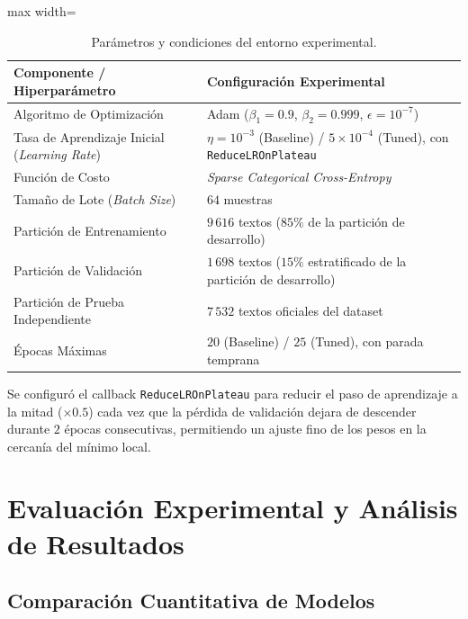 \documentclass[12pt, a4paper]{article}
\begin{document}
\begin{table}[H]
    \centering
    \caption{Parámetros y condiciones del entorno experimental.}
    \label{tab:training_conditions}
    \begin{adjustbox}{max width=\textwidth}
    \begin{tabular}{@{}ll@{}}
        \toprule
        \textbf{Componente / Hiperparámetro} & \textbf{Configuración Experimental} \\
        \midrule
        Algoritmo de Optimización            & Adam ($\beta_1 = 0.9$, $\beta_2 = 0.999$, $\epsilon = 10^{-7}$) \\
        Tasa de Aprendizaje Inicial (\textit{Learning Rate}) & $\eta = 10^{-3}$ (Baseline) / $5 \times 10^{-4}$ (Tuned), con \texttt{ReduceLROnPlateau} \\
        Función de Costo                     & \textit{Sparse Categorical Cross-Entropy} \\
        Tamaño de Lote (\textit{Batch Size}) & $64$ muestras \\
        Partición de Entrenamiento           & $9\,616$ textos ($85\%$ de la partición de desarrollo) \\
        Partición de Validación              & $1\,698$ textos ($15\%$ estratificado de la partición de desarrollo) \\
        Partición de Prueba Independiente    & $7\,532$ textos oficiales del dataset \\
        Épocas Máximas                       & $20$ (Baseline) / $25$ (Tuned), con parada temprana \\
        \bottomrule
    \end{tabular}
    \end{adjustbox}
\end{table}

Se configuró el callback \texttt{ReduceLROnPlateau} para reducir el paso de aprendizaje a la mitad ($\times 0.5$) cada vez que la pérdida de validación dejara de descender durante $2$ épocas consecutivas, permitiendo un ajuste fino de los pesos en la cercanía del mínimo local.

\section{Evaluación Experimental y Análisis de Resultados}

\subsection{Comparación Cuantitativa de Modelos}
\end{document}
